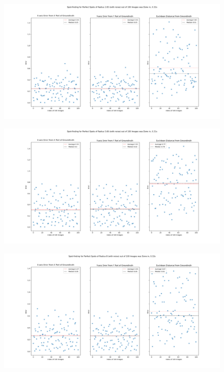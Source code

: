 \documentclass[aps,pra,a4paper,nofootinbib,onecolumn,tightenlines,longbibliography,12pt,amsfonts,amssymb,amsmath,floatfix]{revtex4-2} %
\begin{document}
    \begin{figure}[H]
      \begin{center}
        \includegraphics[width=1.0\textwidth]{project_pics/error_r283_noise.png}
      \end{center}
      \caption{}
      \label{fig:tri_er_r283_noise}
    \end{figure}
    
    \begin{figure}[H]
      \begin{center}
        \includegraphics[width=1.0\textwidth]{project_pics/error_r566_noise.png}
      \end{center}
      \caption{}
      \label{fig:tri_er_r566_noise}
    \end{figure}
    
    \begin{figure}[H]
      \begin{center}
        \includegraphics[width=1.0\textwidth]{project_pics/error_r8_noise.png}
      \end{center}
      \caption{}
      \label{fig:tri_er_r8_noise}
    \end{figure}
    
\end{document}
